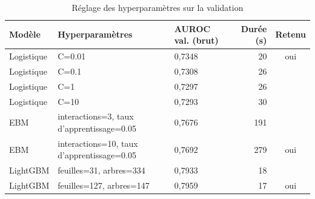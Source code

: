 \begin{table}[htbp]
\centering
\footnotesize\setlength{\tabcolsep}{4pt}
\caption{Réglage des hyperparamètres sur la validation}\label{tab:hyper}
\begin{tabular}{lllrc}
\toprule
Modèle & Hyperparamètres & AUROC val. (brut) & Durée (s) & Retenu \\
\midrule
Logistique & C=0.01 & 0,7348 & 20 & oui \\
Logistique & C=0.1 & 0,7308 & 26 &  \\
Logistique & C=1 & 0,7297 & 26 &  \\
Logistique & C=10 & 0,7293 & 30 &  \\
EBM & interactions=3, taux d'apprentissage=0.05 & 0,7676 & 191 &  \\
EBM & interactions=10, taux d'apprentissage=0.05 & 0,7692 & 279 & oui \\
LightGBM & feuilles=31, arbres=334 & 0,7933 & 18 &  \\
LightGBM & feuilles=127, arbres=147 & 0,7959 & 17 & oui \\
\bottomrule
\end{tabular}
\end{table}

